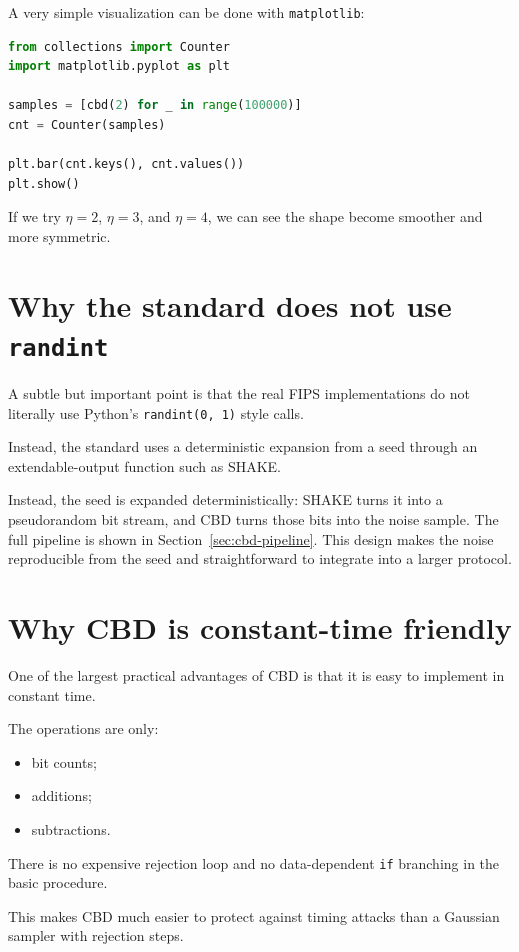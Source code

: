 A very simple visualization can be done with \texttt{matplotlib}:

\begin{lstlisting}[language=Python]
from collections import Counter
import matplotlib.pyplot as plt

samples = [cbd(2) for _ in range(100000)]
cnt = Counter(samples)

plt.bar(cnt.keys(), cnt.values())
plt.show()
\end{lstlisting}

If we try \(\eta=2\), \(\eta=3\), and \(\eta=4\), we can see the shape become smoother and more symmetric.

\section{Why the standard does not use \texttt{randint}}

A subtle but important point is that the real FIPS implementations do not literally use Python's \texttt{randint(0, 1)} style calls.

Instead, the standard uses a deterministic expansion from a seed through an extendable-output function such as SHAKE.

Instead, the seed is expanded deterministically: SHAKE turns it into a pseudorandom bit stream, and CBD turns those bits into the noise sample. The full pipeline is shown in Section~\ref{sec:cbd-pipeline}. This design makes the noise reproducible from the seed and straightforward to integrate into a larger protocol.

\section{Why CBD is constant-time friendly}

One of the largest practical advantages of CBD is that it is easy to implement in constant time.

The operations are only:

\begin{itemize}
  \item bit counts;
  \item additions;
  \item subtractions.
\end{itemize}

There is no expensive rejection loop and no data-dependent \texttt{if} branching in the basic procedure.

This makes CBD much easier to protect against timing attacks than a Gaussian sampler with rejection steps.

